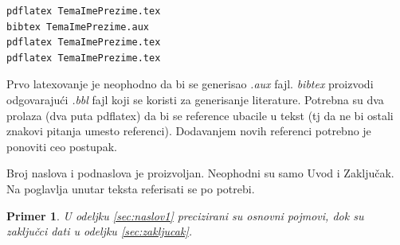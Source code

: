 \documentclass[a4paper]{article}
\newtheorem{primer}{Primer}[section]
\begin{document}
{\begin{verbatim}
pdflatex TemaImePrezime.tex 
bibtex TemaImePrezime.aux 
pdflatex TemaImePrezime.tex 
pdflatex TemaImePrezime.tex 
\end{verbatim}
Prvo latexovanje je neophodno da bi se generisao {\em .aux} fajl. {\em bibtex} proizvodi odgovarajući {\em .bbl} fajl koji se koristi za generisanje literature. 
Potrebna su dva prolaza (dva puta pdflatex) da bi se reference ubacile u tekst (tj da ne bi ostali znakovi pitanja umesto referenci). Dodavanjem novih referenci potrebno je ponoviti ceo postupak.  


Broj naslova i podnaslova je proizvoljan. Neophodni su samo Uvod i Zaključak. Na poglavlja unutar teksta referisati se po potrebi. 
\begin{primer}
U odeljku \ref{sec:naslov1} precizirani su osnovni pojmovi, dok su zaključci dati u odeljku \ref{sec:zakljucak}.
\end{primer}

\fi



}
\end{document}

